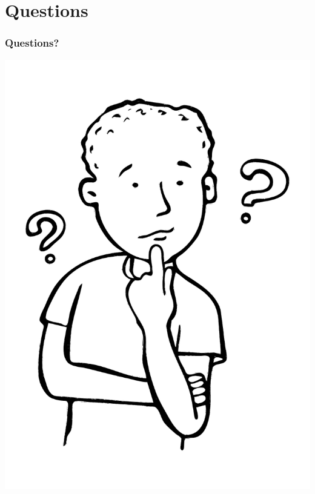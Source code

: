 \section{Questions}
\begin{frame}
        \frametitle{\textbf{Questions?}}
        \vspace{-15mm}
        \begin{center}
        \includegraphics[scale=0.4]{./figs/Boy-asking-question.pdf}
        \end{center}
        \vspace{-25mm}
\end{frame}

